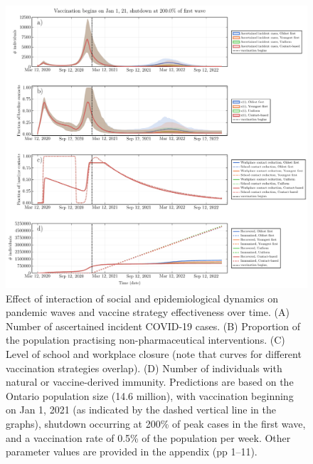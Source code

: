 \begin{figure}
\includegraphics[width=\textwidth]{chapter_3/ts_plot.pdf}
\caption{Effect of interaction of social and epidemiological dynamics on pandemic waves and vaccine strategy effectiveness over time. (A) Number of ascertained incident COVID-19 cases. (B) Proportion of the population practising non-pharmaceutical interventions. (C) Level of school and workplace closure (note that curves for different vaccination strategies overlap). (D) Number of individuals with natural or vaccine-derived immunity. Predictions are based on the Ontario population size (14.6 million), with vaccination beginning on Jan 1, 2021 (as indicated by the dashed vertical line in the graphs), shutdown occurring at 200\% of peak cases in the first wave, and a vaccination rate of 0.5\% of the population per week. Other parameter values are provided in the appendix (pp 1–11).}
\label{fig2}  
\end{figure}

